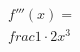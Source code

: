 \documentclass[preview]{standalone}
\begin{document}
\begin{align*}
f'''(x)=\\frac{1\cdot2}{x^3}
\end{align*}
\end{document}
